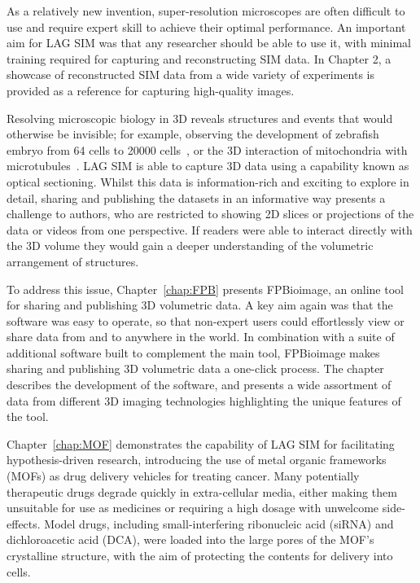 As a relatively new invention, super-resolution microscopes are often difficult to use and require expert skill to achieve their optimal performance. 
An important aim for LAG SIM was that any researcher should be able to use it, with minimal training required for capturing and reconstructing SIM data. 
In Chapter 2, a showcase of reconstructed SIM data from a wide variety of experiments is provided as a reference for capturing high-quality images. 

Resolving microscopic biology in 3D reveals structures and events that would otherwise be invisible; for example, observing the development of zebrafish embryo from 64 cells to \num{20000} cells~\cite{keller2008reconstruction}, or the 3D interaction of mitochondria with microtubules~\cite{huang2016ultra}. 
LAG SIM is able to capture 3D data using a capability known as optical sectioning.
Whilst this data is information-rich and exciting to explore in detail, sharing and publishing the datasets in an informative way presents a challenge to authors, who are restricted to showing 2D slices or projections of the data or videos from one perspective.
If readers were able to interact directly with the 3D volume they would gain a deeper understanding of the volumetric arrangement of structures.

To address this issue, Chapter~\ref{chap:FPB} presents FPBioimage, an online tool for sharing and publishing 3D volumetric data. 
A key aim again was that the software was easy to operate, so that non-expert users could effortlessly view or share data from and to anywhere in the world. 
In combination with a suite of additional software built to complement the main tool, FPBioimage makes sharing and publishing 3D volumetric data a one-click process.
The chapter describes the development of the software, and presents a wide assortment of data from different 3D imaging technologies highlighting the unique features of the tool. 

Chapter~\ref{chap:MOF} demonstrates the capability of LAG SIM for facilitating hypothesis-driven research, introducing the use of metal organic frameworks (MOFs) as drug delivery vehicles for treating cancer. 
Many potentially therapeutic drugs degrade quickly in extra-cellular media, either making them unsuitable for use as medicines or requiring a high dosage with unwelcome side-effects. 
Model drugs, including small-interfering ribonucleic acid (siRNA) and dichloroacetic acid (DCA), were loaded into the large pores of the MOF's crystalline structure, with the aim of protecting the contents for delivery into cells. 

